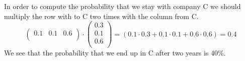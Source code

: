 \documentclass[a4paper]{article}
\begin{document}
In order to compute the probability that we stay with company C we should multiply the row with to C two times with the column from C.
\[
\left(
\begin{array}{ccc}
0.1 & 0.1 & 0.6 \\
\end{array}
\right)
\cdot
\left(
\begin{array}{c}
0.3 \\
0.1 \\
0.6 \\
\end{array}
\right)
=
(0.1 \cdot 0.3 + 0.1 \cdot 0.1 + 0.6 \cdot 0.6) = 0.4
\]
We see that the probability that we end up in C after two years is $40 \%$.
\end{document}
